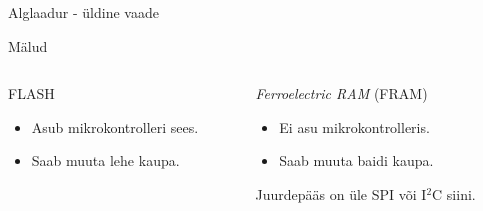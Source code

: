 \documentclass[pdf,draft]{beamer}
\begin{document}
\begin{frame}{Alglaadur - üldine vaade}
\end{frame}

\begin{frame}{Mälud}
    \begin{columns}[t]
        \begin{column}{0.46\textwidth}
            \begin{block}{FLASH}
                \begin{itemize}
                    \item Asub mikrokontrolleri sees.
                    \item Saab muuta lehe kaupa.
                \end{itemize}
            \end{block}
        \end{column}
        \begin{column}{0.46\textwidth}
            \begin{block}{\textit{Ferroelectric RAM} (FRAM)}
                \begin{itemize}
                    \item Ei asu mikrokontrolleris.
                    \item Saab muuta baidi kaupa.
                \end{itemize}
                Juurdepääs on üle SPI või I\({}^2\)C siini.
            \end{block}
        \end{column}
    \end{columns}
\end{frame}
\end{document}
